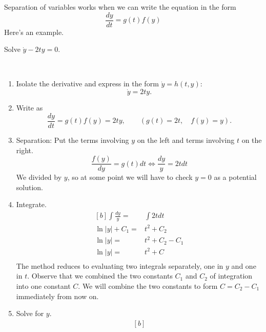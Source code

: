Separation of variables works when we can write the equation in the form
\begin{equation*}
  \displaystyle \frac{dy}{dt} = g(t)f(y)
\end{equation*}
Here's an example.
\begin{example}
  Solve $\displaystyle \dot y -2ty = 0$.
\end{example}
\Solution\\
\begin{enumerate}
\item Isolate the derivative and express in the form $\displaystyle \dot y = h(t, y)$:
  \begin{equation*}
    \displaystyle \dot y = 2ty. 
  \end{equation*}
\item Write as
  \begin{equation*}
    \displaystyle \frac{dy}{dt} = g(t)f(y) = 2ty, \qquad (g(t) = 2t, \quad f(y) = y). 
  \end{equation*}
\item Separation: Put the terms involving $y$ on the left and terms involving $t$ on the right.
  \begin{equation*}
    \displaystyle \frac{f(y)}{dy} = g(t)dt \Longleftrightarrow \frac{dy}{y} = 2t dt
  \end{equation*}
  \Warning We divided by $y$, so at some point we will have to check
  $y = 0$ as a potential solution.
\item Integrate.
  \begin{equation*}
    \begin{aligned}[b]
      \displaystyle \int \frac{dy}{y} = & \int 2t dt \\
      \displaystyle \ln |y| + C_1 = & t^2 + C_2 \\
      \displaystyle \ln |y| = & t^2 + C_2 - C_1 \\
      \displaystyle \ln |y| = & t^2 + C \\
    \end{aligned}
  \end{equation*}
  \Note The method reduces to evaluating two integrals separately, one in $y$ and one in $t$.
  Observe that we combined the two constants $C_1$ and $C_2$ of integration into one constant $C$.
  We will combine the two constants to form $C = C_2 − C_1$ immediately from now on.
\item Solve for $y$.
  \begin{equation*}
    \begin{aligned}[b]

\end{aligned}
\end{equation*}
\end{enumerate}
